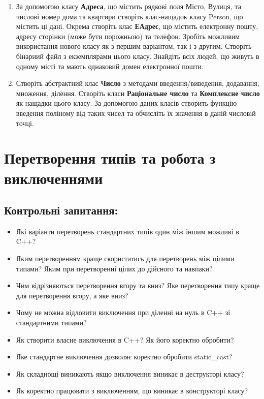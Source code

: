 \documentclass[a5paper,titlepage,openany,twoside,
]
{book_unv}%
\begin{document}
\begin{enumerate}
\begin{enumerate}
\begin{enumerate}
\item
За допомогою класу \textbf{Адреса}, що містить рядкові поля Місто, Вулиця, та числові номер дома та квартири
створіть клас-нащадок класу Person, що містить ці дані. Окрема створіть клас \textbf{ЕАдрес}, що містить
електронну пошту, адресу сторінки (може бути порожньою) та телефон. 
Зробіть можливим використання нового класу як з першим варіантом,
так і з другим. Створіть бінарний файл з екземплярами цього класу. Знайдіть всіх людей, що 
живуть в одному місті та мають однаковий домен електронної пошти. 


\item
Створіть абстрактний клас \textbf{Число} з методами введення/виведення, додавання, множення, ділення.
Створіть класи \textbf{Раціональне число} та \textbf{Комплексне число} як нащадки цього класу. 
За допомогою даних класів створить функцію введення поліному від таких чисел
та обчисліть їх значення в даній числовій точці.


\end{enumerate}


\chapter{Перетворення типів та робота з виключеннями}
%

\section{Контрольні запитання:}
\begin{itemize}
\item
  Які варіанти перетворень стандартних типів один між іншим можливі в
  C++?
\item
  Яким перетворенням краще скористатись для перетворень між цілими
  типами? Яким при перетворенні цілих до дійсного та навпаки?
\item
  Чим відрізняються перетворення вгору та вниз? Яке перетворення типу
  краще для перетворення вгору, а яке вниз?
\item
  Чому не можна відловити виключення при діленні на нуль в C++ зі
  стандартними типами?
\item
  Як створити власне виключення в C++? Як його коректно обробити?
\item
  Яке стандартне виключення дозволяє коректно обробити static\_cast?
\item
  Як складнощі виникають якщо виключення виникає в деструкторі класу?
\item
  Як коректно працювати з виключенням, що виникає в конструкторі класу?
\end{itemize}


\end{enumerate}
\end{enumerate}
\end{document}
